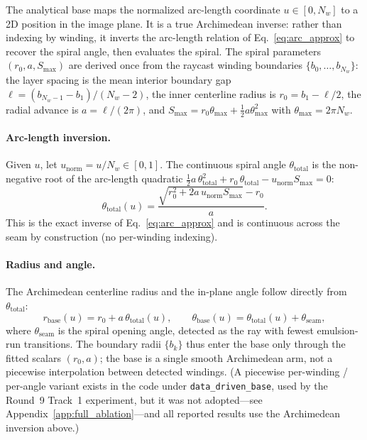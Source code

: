 \documentclass[11pt,a4paper]{article}
\begin{document}
The analytical base maps the normalized arc-length coordinate $u \in [0, N_w]$ to a 2D position in the image plane. It is a true Archimedean inverse: rather than indexing by winding, it inverts the arc-length relation of Eq.~\eqref{eq:arc_approx} to recover the spiral angle, then evaluates the spiral. The spiral parameters $(r_0, a, S_{\max})$ are derived once from the raycast winding boundaries $\{b_0, \ldots, b_{N_w}\}$: the layer spacing is the mean interior boundary gap $\ell = (b_{N_w-1} - b_1)/(N_w - 2)$, the inner centerline radius is $r_0 = b_1 - \ell/2$, the radial advance is $a = \ell/(2\pi)$, and $S_{\max} = r_0\theta_{\max} + \tfrac12 a\theta_{\max}^2$ with $\theta_{\max} = 2\pi N_w$.

\paragraph{Arc-length inversion.} Given $u$, let $u_{\text{norm}} = u/N_w \in [0,1]$. The continuous spiral angle $\theta_{\text{total}}$ is the non-negative root of the arc-length quadratic $\tfrac12 a\,\theta_{\text{total}}^2 + r_0\,\theta_{\text{total}} - u_{\text{norm}} S_{\max} = 0$:
\begin{equation}
    \theta_{\text{total}}(u) = \frac{\sqrt{r_0^2 + 2 a\, u_{\text{norm}} S_{\max}} - r_0}{a}.
    \label{eq:arc_inverse}
\end{equation}
This is the exact inverse of Eq.~\eqref{eq:arc_approx} and is continuous across the seam by construction (no per-winding indexing).

\paragraph{Radius and angle.} The Archimedean centerline radius and the in-plane angle follow directly from $\theta_{\text{total}}$:
\begin{equation}
    r_{\text{base}}(u) = r_0 + a\,\theta_{\text{total}}(u),
    \qquad
    \theta_{\text{base}}(u) = \theta_{\text{total}}(u) + \theta_{\text{seam}},
    \label{eq:r_theta_base}
\end{equation}
where $\theta_{\text{seam}}$ is the spiral opening angle, detected as the ray with fewest emulsion-run transitions. The boundary radii $\{b_k\}$ thus enter the base only through the fitted scalars $(r_0, a)$; the base is a single smooth Archimedean arm, not a piecewise interpolation between detected windings. (A piecewise per-winding / per-angle variant exists in the code under \texttt{data\_driven\_base}, used by the Round~9 Track~1 experiment, but it was not adopted---see Appendix~\ref{app:full_ablation}---and all reported results use the Archimedean inversion above.)
\end{document}

